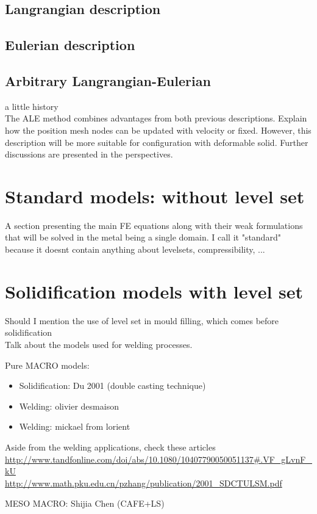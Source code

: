 \subsection{Langrangian description}
\subsection{Eulerian description}
\subsection{Arbitrary Langrangian-Eulerian}
a little history \citep{hirt_arbitrary_1971} \\ 
The ALE method combines advantages from both previous descriptions. Explain how the position mesh nodes can be
updated with velocity or fixed. However, this description will be more suitable for configuration with deformable solid. 
Further discussions are presented in the perspectives.

\section{Standard models: without level set}
A section presenting the main FE equations along with their weak formulations that will be solved 
in the metal being a single domain. I call it "standard" because it doesnt contain anything about 
levelsets, compressibility, ...

\section{Solidification models with level set}
Should I mention the use of level set in mould filling, which comes before solidification \\
Talk about the models used for welding processes. 

Pure MACRO models:
\begin{itemize}
\item Solidification: Du 2001 (double casting technique)
\item Welding: olivier desmaison
\item Welding: mickael from lorient 
\end{itemize}
Aside from the welding applications, check these articles
\url{http://www.tandfonline.com/doi/abs/10.1080/10407790050051137#.VF_gLvnF_kU} \\
\url{http://www.math.pku.edu.cn/pzhang/publication/2001_SDCTULSM.pdf}

MESO MACRO: Shijia Chen (CAFE+LS)

